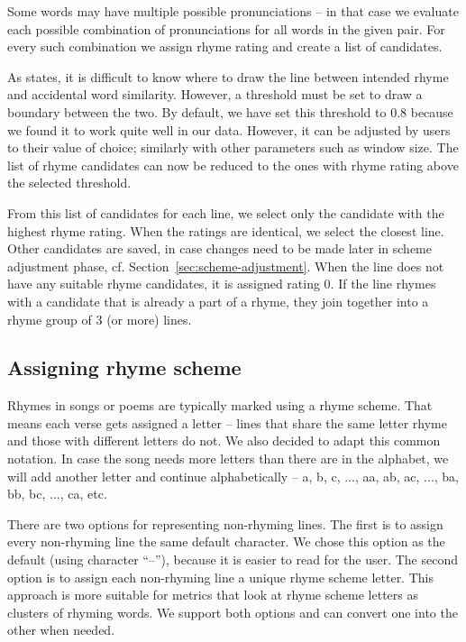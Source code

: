 Some words may have multiple possible pronunciations -- in that case we evaluate each possible combination of pronunciations for all words in the given pair. For every such combination we assign rhyme rating and create a list of candidates.

As \cite{rhymes_overview} states, it is difficult to know where to draw the line between intended rhyme and accidental word similarity. However, a threshold must be set to draw a boundary between the two. By default, we have set this threshold to 0.8 because we found it to work quite well in our data. However, it can be adjusted by users to their value of choice; similarly with other parameters such as window size. The list of rhyme candidates can now be reduced to the ones with rhyme rating above the selected threshold.

From this list of candidates for each line, we select only the candidate with the highest rhyme rating. When the ratings are identical, we select the closest line. Other candidates are saved, in case changes need to be made later in scheme adjustment phase, cf. Section~\ref{sec:scheme-adjustment}. When the line does not have any suitable rhyme candidates, it is assigned rating 0. If the line rhymes with a candidate that is already a part of a rhyme, they join together into a rhyme group of 3 (or more) lines.
 



\subsection{Assigning rhyme scheme}\label{sec:scheme}
 Rhymes in songs or poems are typically marked using a rhyme scheme. That means each verse gets assigned a letter -- lines that share the same letter rhyme and those with different letters do not. We also decided to adapt this common notation. In case the song needs more letters than there are in the alphabet, we will add another letter and continue alphabetically -- a, b, c, ..., aa, ab, ac, ..., ba, bb, bc, ..., ca, etc.
 
 There are two options for representing non-rhyming lines. The first is to assign every non-rhyming line the same default character. We chose this option as the default (using character ``--''), because it is easier to read for the user. The second option is to assign each non-rhyming line a unique rhyme scheme letter. This approach is more suitable for metrics that look at rhyme scheme letters as clusters of rhyming words. We support both options and can convert one into the other when needed.

